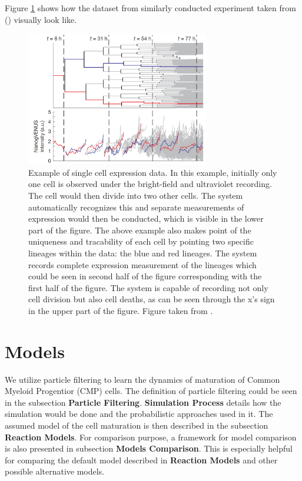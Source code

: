 \documentclass{bioinfo}
\begin{document}
Figure \ref{fig:02} shows how the dataset from similarly conducted experiment taken from (\citealp{Feigelman16}) visually look like.

\begin{figure}[h]
\includegraphics[width=8cm]{figures/cell-generations.png}
\caption{Example of single cell expression data. In this example, initially only one cell is observed under the bright-field and ultraviolet recording. The cell would then divide into two other cells. The system automatically recognizes this and separate measurements of expression would then be conducted, which is visible in the lower part of the figure. The above example also makes point of the uniqueness and tracability of each cell by pointing two specific lineages within the data: the blue and red lineages. The system records complete expression measurement of the lineages which could be seen in second half of the figure corresponding with the first half of the figure. The system is capable of recording not only cell division but also cell deaths, as can be seen through the x's sign in the upper part of the figure. Figure taken from \citealp{Feigelman16}.}\label{fig:02}
\end{figure}

\section{Models}

We utilize particle filtering to learn the dynamics of maturation of Common Myeloid Progentior (CMP) cells. The definition of particle filtering could be seen in the subsection \textbf{Particle Filtering}. \textbf{Simulation Process} details how the simulation would be done and the probabilistic approaches used in it. The assumed model of the cell maturation is then described in the subsection \textbf{Reaction Models}. For comparison purpose, a framework for model comparison is also presented in subsection \textbf{Models Comparison}. This is especially helpful for comparing the default model described in \textbf{Reaction Models} and other possible alternative models.
\end{document}
